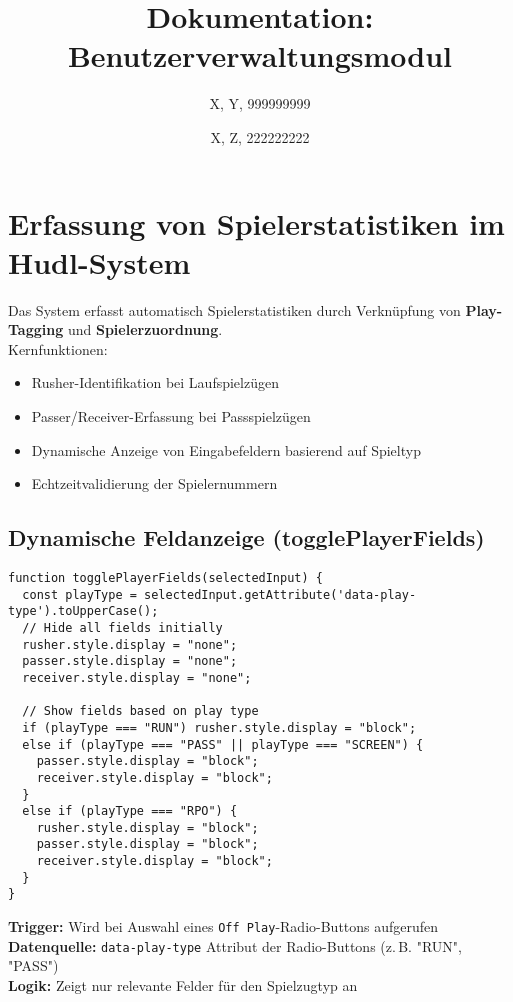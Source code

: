 \documentclass[12pt]{article}
\title{Dokumentation: Benutzerverwaltungsmodul}
\author{X, Y, 999999999\\ \and X, Z, 222222222}
\date{}
\begin{document}
\maketitle
\tableofcontents
\newpage

\section{Erfassung von Spielerstatistiken im Hudl-System}

Das System erfasst automatisch Spielerstatistiken durch Verknüpfung von \textbf{Play-Tagging} und \textbf{Spielerzuordnung}.\\
Kernfunktionen:
\begin{itemize}
    \item Rusher-Identifikation bei Laufspielzügen
    \item Passer/Receiver-Erfassung bei Passspielzügen
    \item Dynamische Anzeige von Eingabefeldern basierend auf Spieltyp
    \item Echtzeitvalidierung der Spielernummern
\end{itemize}

\subsection{Dynamische Feldanzeige (togglePlayerFields)}

\begin{verbatim}
function togglePlayerFields(selectedInput) {
  const playType = selectedInput.getAttribute('data-play-type').toUpperCase();
  // Hide all fields initially
  rusher.style.display = "none";
  passer.style.display = "none";
  receiver.style.display = "none";

  // Show fields based on play type
  if (playType === "RUN") rusher.style.display = "block";
  else if (playType === "PASS" || playType === "SCREEN") {
    passer.style.display = "block";
    receiver.style.display = "block";
  }
  else if (playType === "RPO") {
    rusher.style.display = "block";
    passer.style.display = "block";
    receiver.style.display = "block";
  }
}
\end{verbatim}


\textbf{Trigger:} Wird bei Auswahl eines \texttt{Off Play}-Radio-Buttons aufgerufen \\
\textbf{Datenquelle:} \texttt{data-play-type} Attribut der Radio-Buttons (z.\,B. "RUN", "PASS") \\
\textbf{Logik:} Zeigt nur relevante Felder für den Spielzugtyp an
\end{document}

